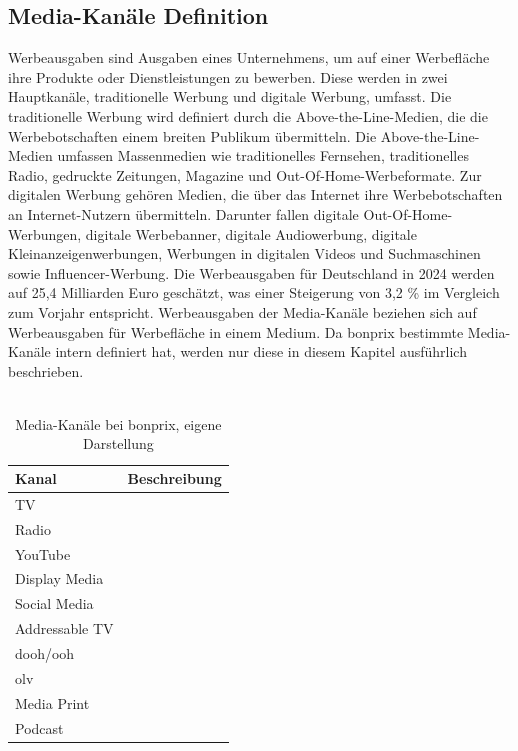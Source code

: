 \subsection{Media-Kanäle Definition}
Werbeausgaben sind Ausgaben eines Unternehmens, um auf einer Werbefläche ihre Produkte oder Dienstleistungen zu bewerben. Diese werden in zwei Hauptkanäle, traditionelle Werbung und digitale Werbung, umfasst. Die traditionelle Werbung wird definiert durch die Above-the-Line-Medien, die die Werbebotschaften einem breiten Publikum übermitteln. Die Above-the-Line-Medien umfassen Massenmedien wie traditionelles Fernsehen, traditionelles Radio, gedruckte Zeitungen, Magazine und Out-Of-Home-Werbeformate. Zur digitalen Werbung gehören Medien, die über das Internet ihre Werbebotschaften an Internet-Nutzern übermitteln. Darunter fallen digitale Out-Of-Home-Werbungen, digitale Werbebanner, digitale Audiowerbung, digitale Kleinanzeigenwerbungen, Werbungen in digitalen Videos und Suchmaschinen sowie Influencer-Werbung. Die Werbeausgaben für Deutschland in 2024 werden auf 25,4 Milliarden Euro geschätzt, was einer Steigerung von 3,2 \% im Vergleich zum Vorjahr entspricht\cite{statista_werbung}. Werbeausgaben der Media-Kanäle beziehen sich auf Werbeausgaben für Werbefläche in einem Medium. Da bonprix bestimmte Media-Kanäle intern definiert hat, werden nur diese in diesem Kapitel ausführlich beschrieben. \\\\
\begin{table}[h!]
    \centering
    \begin{tabular}{|l|p{10cm}|}
        \hline
        \textbf{Kanal} & \textbf{Beschreibung} \\ \hline
        TV & \\ \hline
        Radio & \\ \hline
        YouTube & \\ \hline
        Display Media & \\ \hline
        Social Media & \\ \hline
        Addressable TV & \\ \hline
        \ac{dooh}/\ac{ooh} & \\ \hline
        \ac{olv} & \\ \hline
        Media Print & \\ \hline
        Podcast & \\ \hline
    \end{tabular}
    \caption{Media-Kanäle bei bonprix, eigene Darstellung}
    \label{tab:mediachannels}
\end{table}

